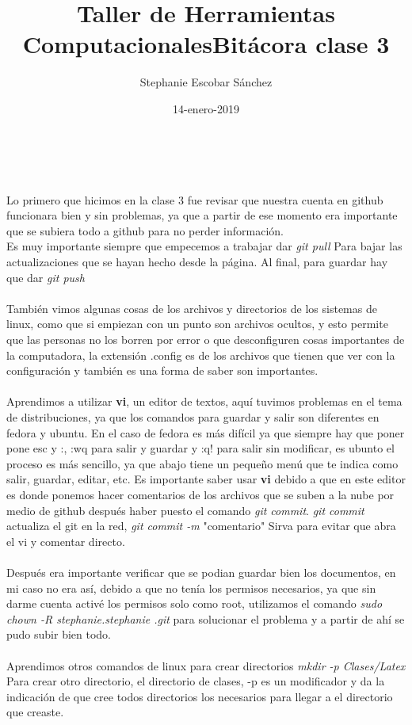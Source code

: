 \documentclass [letterpaper, 12 pts, oneside]{article}
\title{\Huge Taller de Herramientas Computacionales}
\author{Stephanie Escobar Sánchez}
\date{14-enero-2019}
\begin{document}
	\maketitle

	\newpage
	
	\title{\Huge Bitácora clase 3} \\
	\\

	Lo primero que hicimos en la clase 3 fue revisar que nuestra cuenta en github funcionara bien y sin problemas, ya que a partir de ese momento era importante que se subiera todo a github para no perder información.\\
	Es muy importante siempre que empecemos a trabajar dar \textit{git pull} Para bajar las actualizaciones que se hayan hecho desde la página. Al final, para guardar hay que dar \textit{git push}\\
	\\
	También vimos algunas cosas de los archivos y directorios de los sistemas de linux, como que si empiezan con un punto son archivos ocultos, y esto permite que las personas no los borren por error o que desconfiguren cosas importantes de la computadora, la extensión .config es de los archivos que tienen que ver con la configuración y también es una forma de saber son importantes.\\
	\\
Aprendimos a utilizar \textbf{vi}, un editor de textos, aquí tuvimos problemas en el tema de distribuciones, ya que los comandos para guardar y salir son diferentes en fedora y ubuntu. En el caso de fedora es más difícil ya que siempre hay que poner pone esc y :, :wq para salir y guardar y :q! para salir sin modificar, es ubunto el proceso es más sencillo, ya que abajo tiene un pequeño menú que te indica como salir, guardar, editar, etc. Es importante saber usar \textbf{vi} debido a que en este editor es donde ponemos hacer comentarios de los archivos que se suben a la nube por medio de github después haber puesto el comando \textit{git commit}. \textit{git commit} actualiza el git en la red, \textit{git commit -m} "comentario" Sirva para evitar que abra el vi y comentar directo.\\
\\
Después era importante verificar que se podian guardar bien los documentos, en mi caso no era así, debido a que no tenía los permisos necesarios, ya que sin darme cuenta activé los permisos solo como root, utilizamos el comando \textit{sudo chown -R stephanie.stephanie .git} para solucionar el problema y a partir de ahí se pudo subir bien todo.\\
\\
Aprendimos otros comandos de linux para crear directorios 
\textit{mkdir -p Clases/Latex} Para crear otro directorio, el directorio de clases, -p es un modificador y da la indicación de que cree todos directorios los necesarios para llegar a el directorio que creaste.\\
\\
	
\end{document}
